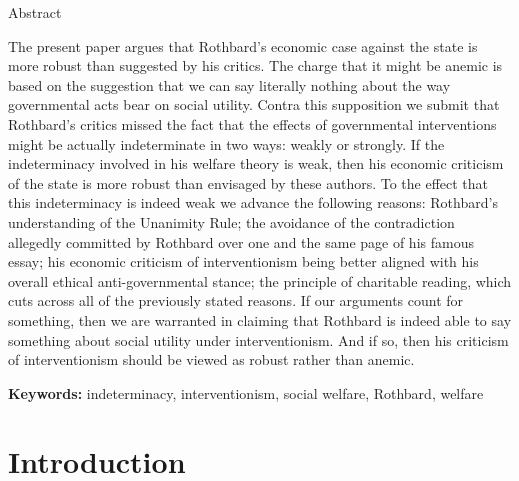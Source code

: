 Abstract



The present paper argues that Rothbard's economic case against the state is more robust than suggested by his critics. The charge that it might be anemic is based on the suggestion that we can say literally nothing about the way governmental acts bear on social utility. Contra this supposition we submit that Rothbard's critics missed the fact that the effects of governmental interventions might be actually indeterminate in two ways: weakly or strongly. If the indeterminacy involved in his welfare theory is weak, then his economic criticism of the state is more robust than envisaged by these authors. To the effect that this indeterminacy is indeed weak we advance the following reasons: Rothbard's understanding of the Unanimity Rule; the avoidance of the contradiction allegedly committed by Rothbard over one and the same page of his famous essay; his economic criticism of interventionism being better aligned with his overall ethical anti-governmental stance; the principle of charitable reading, which cuts across all of the previously stated reasons. If our arguments count for something, then we are warranted in claiming that Rothbard is indeed able to say something about social utility under interventionism. And if so, then his criticism of interventionism should be viewed as robust rather than anemic.



\textbf{Keywords:} indeterminacy, interventionism, social welfare, Rothbard, welfare



\section{Introduction}

